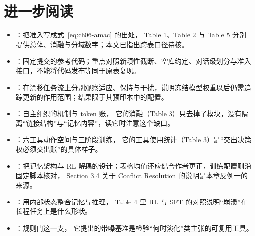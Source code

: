 \section*{进一步阅读}
\begin{itemize}
  \item \cite{amac-2603}：把准入写成式~\eqref{eq:ch06-amac} 的出处，
        Table 1、Table 2 与 Table 5 分别提供总体、消融与分域数字；本文已指出跨表口径待核。
  \item \cite{amac-code-2026}：固定提交的参考代码；重点对照新颖性截断、空库约定、对话级划分与准入接口，不能将代码发布等同于原表复现。
  \item \cite{continual-self-evolution-2610}：在漂移任务流上分别观察适应、保持与干扰，说明冻结模型权重以后仍需追踪更新的作用范围；结果限于其预印本中的配置。
  \item \cite{amem-2502}：自主组织的机制与 token 账，
        它的消融（Table 3）只去掉了模块，没有隔离“链接结构”与“记忆内容”，读它时注意这个缺口。
  \item \cite{agemem-2601}：六工具动作空间与三阶段训练，
        它的工具使用统计（Table 3）是“交出决策权必须交出账”的具体样子。
  \item \cite{memalpha-2509,memalpha-erratum-2025,memalpha-code-2025}：把记忆架构与 RL 解耦的设计；表格均值还应结合作者更正，训练配置则沿固定脚本核对，
        Section 3.4 关于 Conflict Resolution 的说明是本章反例一的来源。
  \item \cite{mem1-2506}：用内部状态整合记忆与推理，
        Table 4 里 RL 与 SFT 的对照说明“崩溃”在长程任务上是什么形状。
  \item \cite{dmem-2603}：规则门这一支，
        它提出的带噪基准是检验“何时演化”类主张的可复用工具。
\end{itemize}
